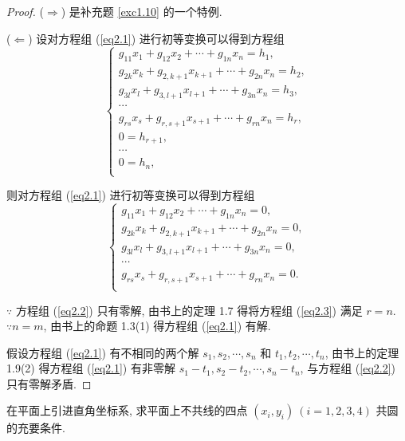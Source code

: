 \documentclass{ctexart}
\begin{document}
\begin{proof}
    ($\Rightarrow$) 是补充题 \ref{exc1.10} 的一个特例.

    ($\Leftarrow$) 设对方程组 (\ref{eq2.1}) 进行初等变换可以得到方程组
    \[\begin{cases}
        g_{11}x_1+g_{12}x_2+\cdots+g_{1n}x_n=h_1, \\
        g_{2k}x_k+g_{2,k+1}x_{k+1}+\cdots+g_{2n}x_n=h_2, \\
        g_{3l}x_l+g_{3,l+1}x_{l+1}+\cdots+g_{3n}x_n=h_3, \\
        \cdots \\
        g_{rs}x_s+g_{r,s+1}x_{s+1}+\cdots+g_{rn}x_n=h_r, \\
        0=h_{r+1}, \\
        \cdots \\
        0=h_n, \\
    \end{cases}\]

    则对方程组 (\ref{eq2.1}) 进行初等变换可以得到方程组
    \begin{equation}\label{eq2.3}
        \begin{cases}
            g_{11}x_1+g_{12}x_2+\cdots+g_{1n}x_n=0, \\
            g_{2k}x_k+g_{2,k+1}x_{k+1}+\cdots+g_{2n}x_n=0, \\
            g_{3l}x_l+g_{3,l+1}x_{l+1}+\cdots+g_{3n}x_n=0, \\
            \cdots \\
            g_{rs}x_s+g_{r,s+1}x_{s+1}+\cdots+g_{rn}x_n=0. \\
        \end{cases}
    \end{equation}
    
    $\because$ 方程组 (\ref{eq2.2}) 只有零解, 由书上的定理 1.7 得将方程组 (\ref{eq2.3}) 满足 $r=n$. $\because n=m$, 由书上的命题 1.3(1) 得方程组 (\ref{eq2.1}) 有解.
    
    假设方程组 (\ref{eq2.1}) 有不相同的两个解 $s_1,s_2,\cdots,s_n$ 和 $t_1,t_2,\cdots,t_n$, 由书上的定理 1.9(2) 得方程组 (\ref{eq2.1}) 有非零解 $s_1-t_1,s_2-t_2,\cdots,s_n-t_n$, 与方程组 (\ref{eq2.2}) 只有零解矛盾.
\end{proof}
\begin{exercisec}[1.15(2)]
    在平面上引进直角坐标系, 求平面上不共线的四点 $(x_i,y_i)\ (i=1,2,3,4)$ 共圆的充要条件.
\end{exercisec}
\end{document}
